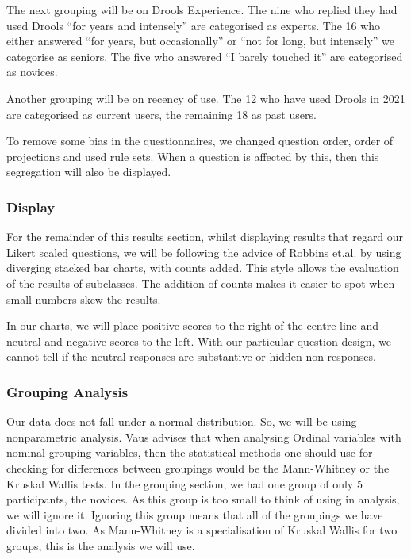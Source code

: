 The next grouping will be on Drools Experience.
The nine who replied they had used Drools ``for years and intensely'' are categorised as experts.
The 16 who either answered ``for years, but occasionally'' or ``not for long, but intensely'' we categorise as seniors.
The five who answered ``I barely touched it'' are categorised as novices.

Another grouping will be on recency of use.
The 12 who have used Drools in 2021 are categorised as current users, the remaining 18 as past users.

To remove some bias in the questionnaires, we changed question order, order of projections and used rule sets.
When a question is affected by this, then this segregation will also be displayed.

\subsubsection{Display}
For the remainder of this results section, whilst displaying results that regard our Likert scaled questions, we will be following the advice of Robbins et.al.\cite{robbins2011plotting} by using diverging stacked bar charts, with counts added.
This style allows the evaluation of the results of subclasses.
The addition of counts makes it easier to spot when small numbers skew the results.

In our charts, we will place positive scores to the right of the centre line and neutral and negative scores to the left.
With our particular question design, we cannot tell if the neutral responses are substantive or hidden non-responses\cite{blasius2001use}.

\subsubsection{Grouping Analysis}
Our data does not fall under a normal distribution. 
So, we will be using nonparametric analysis.
Vaus\cite{de2013surveys} advises that when analysing Ordinal variables with nominal grouping variables, then the statistical methods one should use for checking for differences between groupings would be the Mann-Whitney\cite{mann1947test} or the Kruskal Wallis\cite{kruskal1952use} tests.
In the grouping section, we had one group of only 5 participants, the novices.
As this group is too small to think of using in analysis, we will ignore it.
Ignoring this group means that all of the groupings we have divided into two.
As Mann-Whitney is a specialisation of Kruskal Wallis for two groups, this is the analysis we will use.

